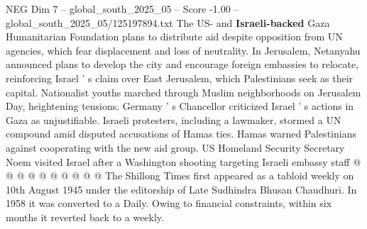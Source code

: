 \begin{textsample}{NEG Dim 7 – global\_south\_2025\_05 – Score -1.00 – global\_south\_2025\_05/125197894.txt}
The US- and \textbf{Israeli-backed} Gaza Humanitarian Foundation plans to distribute aid despite opposition from UN agencies, which fear displacement and loss of neutrality.
In Jerusalem, Netanyahu announced plans to develop the city and encourage foreign embassies to relocate, reinforcing Israel ' s claim over East Jerusalem, which Palestinians seek as their capital.
Nationalist youths marched through Muslim neighborhoods on Jerusalem Day, heightening tensions.
Germany ' s Chancellor criticized Israel ' s actions in Gaza as unjustifiable.
Israeli protesters, including a lawmaker, stormed a UN compound amid disputed accusations of Hamas ties.
Hamas warned Palestinians against cooperating with the new aid group.
US Homeland Security Secretary Noem visited Israel after a Washington shooting targeting Israeli embassy staff @ @ @ @ @ @ @ @ @ @ The Shillong Times first appeared as a tabloid weekly on 10th August 1945 under the editorship of Late Sudhindra Bhusan Chaudhuri.
In 1958 it was converted to a Daily.
Owing to financial constraints, within six months it reverted back to a weekly.

\end{textsample}
